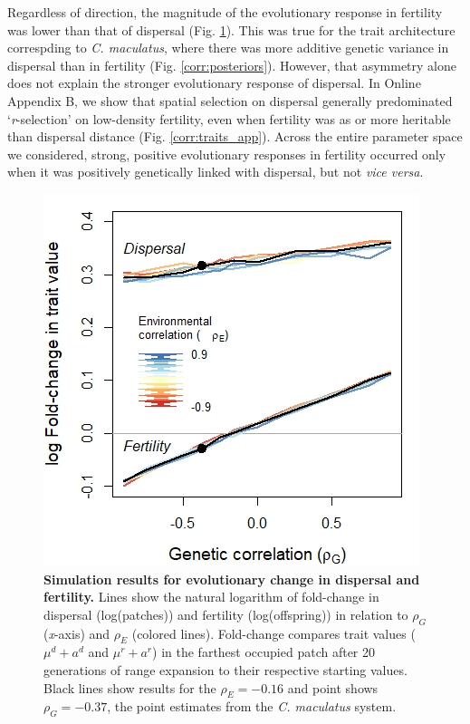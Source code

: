 \documentclass[11pt]{article}
\newcommand{\tom}[1]{{\textit{\color{WildStrawberry}{[#1]}}}}
\begin{document}
Regardless of direction, the magnitude of the evolutionary response in fertility was lower than that of dispersal (Fig. \ref{corr:traits}).
This was true for the trait architecture correspding to \textit{C. maculatus}, where there was more additive genetic variance in dispersal than in fertility (Fig. \ref{corr:posteriors}).
However, that asymmetry alone does not explain the stronger evolutionary response of dispersal.
In Online Appendix B, we show that spatial selection on dispersal generally predominated `\textit{r}-selection’ on low-density fertility, even when fertility was as or more heritable than dispersal distance (Fig. \ref{corr:traits_app}).
Across the entire parameter space we considered, strong, positive evolutionary responses in fertility occurred only when it was positively genetically linked with dispersal, but not \textit{vice versa}.

\begin{figure}[h!]
\centering
\includegraphics[width=0.5\linewidth]{Figures/trait_change}
\caption{\textbf{Simulation results for evolutionary change in dispersal and fertility.} Lines show the natural logarithm of fold-change in dispersal (log(patches)) and fertility (log(offspring)) in relation to $\rho_{G}$ (\textit{x}-axis) and $\rho_{E}$ (colored lines).
Fold-change compares trait values ($\mu^{d} + a^{d}$ and $\mu^{r} + a^{r}$) in the farthest occupied patch after 20 generations of range expansion to their respective starting values.
Black lines show results for the $\rho_{E} = -0.16$ and point shows $\rho_{G} = -0.37$, the point estimates from the \textit{C. maculatus} system.}
\label{corr:traits}
\end{figure}
\end{document}
